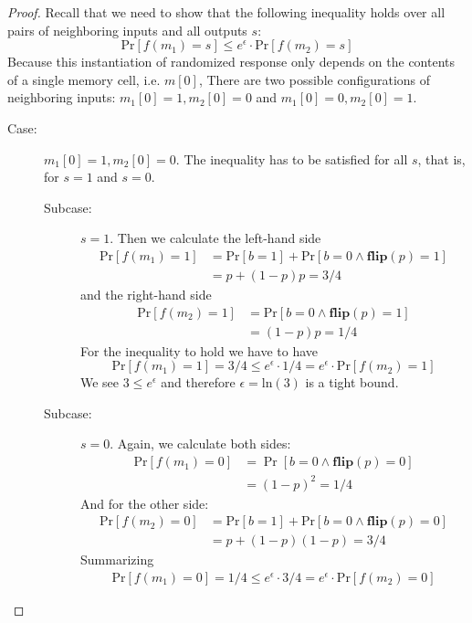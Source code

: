 \documentclass[11pt]{article}
\newcommand{\pr}{\mathrm{Pr}}
\newcommand{\flip}{\mathbf{flip}}
\begin{document}
\begin{proof}
Recall that we need to show that the following inequality holds over all
pairs of neighboring inputs and all outputs $s$:
\[
\pr[f(m_1) = s] \leq e^\epsilon \cdot \pr[f(m_2) = s]
\]
Because this instantiation of randomized response only depends on the
contents of a single memory cell, i.e. $m[0]$, There are two
possible configurations of neighboring inputs: $m_1[0] = 1,
m_2[0] = 0$ and $m_1[0] = 0, m_2[0] = 1$.

\begin{description}
\item[Case:] $m_1[0] = 1, m_2[0] = 0$. The inequality has to be
  satisfied for all $s$, that is, for $s = 1$ and $s = 0$.
  \begin{description}
  \item[Subcase:] $s = 1$.  Then we calculate the left-hand side
    \[
      \begin{array}{ll}
        \pr[f(m_1) = 1]
        &= \mathrm{Pr}[b = 1] + \mathrm{Pr}[b = 0 \land \flip(p) = 1] \\
        &= p + (1-p)p = 3/4
      \end{array}
    \]
    and the right-hand side
    \[
      \begin{array}{ll}
        \pr[f(m_2) = 1]
        &= \mathrm{Pr}[b = 0 \land \flip(p) = 1] \\
        &= (1-p)p = 1/4
      \end{array}
    \]
    For the inequality to hold we have to have
    \[
      \pr[f(m_1) = 1] = 3/4 \leq e^\epsilon\cdot 1/4 = e^\epsilon \cdot \pr[f(m_2) = 1]
    \]
    We see $3 \leq e^\epsilon$ and therefore $\epsilon = \mathrm{ln}(3)$ is a
    tight bound.
  \item[Subcase:] $s = 0$.  Again, we calculate both sides:
    \[
      \begin{array}{ll}
        \pr[f(m_1) = 0]
        &= \Pr[b = 0 \land \flip(p) = 0] \\
        &= (1-p)^2 = 1/4
      \end{array}
    \]
    And for the other side:
    \[
      \begin{array}{ll}
        \pr[f(m_2) = 0]
        &= \pr[b = 1] + \pr[b = 0 \land \flip(p) = 0] \\
        &= p + (1-p)(1-p) = 3/4
      \end{array}
    \]
    Summarizing
    \[
      \begin{array}{ll}
        \pr[f(m_1) = 0] = 1/4 \leq e^\epsilon \cdot 3/4 = e^\epsilon \cdot \pr[f(m_2) = 0]

\end{array}\]
\end{description}
\end{description}
\end{proof}
\end{document}
